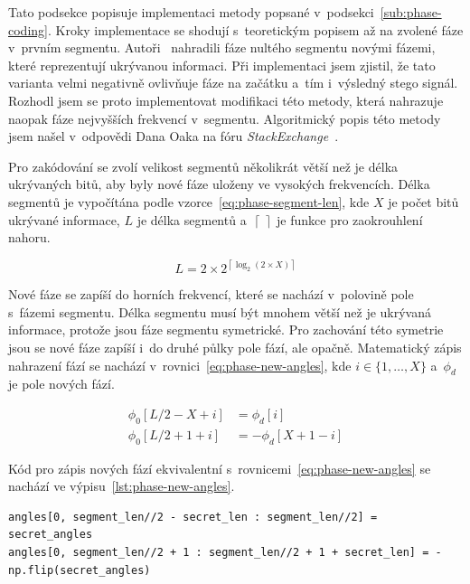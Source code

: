 Tato podsekce popisuje implementaci metody popsané
v~podsekci~\ref{sub:phase-coding}. Kroky implementace se shodují s~teoretickým
popisem až na zvolené fáze v~prvním segmentu. Autoři~\cite{Bender1996}
nahradili fáze nultého segmentu novými fázemi, které reprezentují ukrývanou
informaci. Při implementaci jsem zjistil, že tato varianta velmi negativně
ovlivňuje fáze na začátku a~tím i~výsledný stego signál. Rozhodl jsem se proto
implementovat modifikaci této metody, která nahrazuje naopak fáze nejvyšších
frekvencí v~segmentu. Algoritmický popis této metody jsem našel v~odpovědi Dana
Oaka na fóru \textit{StackExchange}~\cite{PhaseStackExchange}.

Pro zakódování se zvolí velikost segmentů několikrát větší než je délka
ukrývaných bitů, aby byly nové fáze uloženy ve vysokých frekvencích. Délka
segmentů je vypočítána podle vzorce~\ref{eq:phase-segment-len}, kde $X$ je
počet bitů ukrývané informace, $L$ je délka segmentů
a~$\left\lceil~\right\rceil$ je funkce pro zaokrouhlení nahoru.

\begin{equation}
    \label{eq:phase-segment-len}
    L = 2 \times 2^{\left\lceil \log_2{(2 \times X)} \right\rceil}
\end{equation}

\noindent Nové fáze se zapíší do horních frekvencí, které se nachází v~polovině
pole s~fázemi segmentu. Délka segmentu musí být mnohem větší než je ukrývaná
informace, protože jsou fáze segmentu symetrické. Pro zachování této symetrie
jsou se nové fáze zapíší i~do druhé půlky pole fází, ale opačně. Matematický
zápis nahrazení fází se nachází v~rovnici~\ref{eq:phase-new-angles}, kde $i \in
\{ 1, \dots, X \}$ a~$\phi_d$ je pole nových fází.

\begin{equation}
    \begin{aligned}
        \label{eq:phase-new-angles}
        \phi_0[L/2 - X + i] &= \phi_d[i] \\
        \phi_0[L/2 + 1 + i] &= -\phi_d[X + 1 - i]
    \end{aligned}
\end{equation}

\noindent Kód pro zápis nových fází ekvivalentní
s~rovnicemi~\ref{eq:phase-new-angles} se nachází ve
výpisu~\ref{lst:phase-new-angles}.

\begin{lstlisting}[language=PythonPlus, label={lst:phase-new-angles},
caption={Zápis nových fází do pole s~fázemi segmentu.}]
angles[0, segment_len//2 - secret_len : segment_len//2] = secret_angles
angles[0, segment_len//2 + 1 : segment_len//2 + 1 + secret_len] = -np.flip(secret_angles)
\end{lstlisting}

